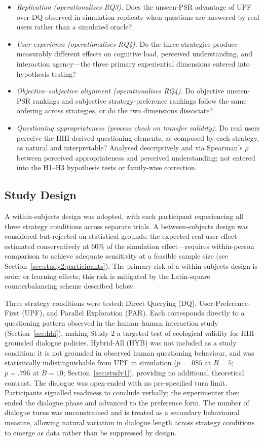 \documentclass[manuscript,review,anonymous]{acmart}
\begin{document}
\begin{itemize}[leftmargin=*]
  \item \textit{Replication (operationalises RQ3).} Does the unseen-PSR advantage of UPF over DQ observed in simulation replicate when questions are answered by real users rather than a simulated oracle?
  \item \textit{User experience (operationalises RQ4).} Do the three strategies produce measurably different effects on cognitive load, perceived understanding, and interaction agency---the three primary experiential dimensions entered into hypothesis testing?
  \item \textit{Objective--subjective alignment (operationalises RQ4).} Do objective unseen-PSR rankings and subjective strategy-preference rankings follow the same ordering across strategies, or do the two dimensions dissociate?
  \item \textit{Questioning appropriateness (process check on transfer validity).} Do real users perceive the HHI-derived questioning elements, as composed by each strategy, as natural and interpretable? Analysed descriptively and via Spearman's $\rho$ between perceived appropriateness and perceived understanding; not entered into the H1--H3 hypothesis tests or family-wise correction.
\end{itemize}

\subsection{Study Design}
\label{sec:study2:design}

A within-subjects design was adopted, with each participant experiencing all three strategy conditions across separate trials. A between-subjects design was considered but rejected on statistical grounds: the expected real-user effect---estimated conservatively at 60\% of the simulation effect---requires within-person comparison to achieve adequate sensitivity at a feasible sample size (see Section~\ref{sec:study2:participants}). The primary risk of a within-subjects design is order or learning effects; this risk is mitigated by the Latin-square counterbalancing scheme described below.

Three strategy conditions were tested: Direct Querying (DQ), User-Preference-First (UPF), and Parallel Exploration (PAR). Each corresponds directly to a questioning pattern observed in the human--human interaction study (Section~\ref{sec:hhi}), making Study 2 a targeted test of ecological validity for HHI-grounded dialogue policies. Hybrid-All (HYB) was not included as a study condition: it is not grounded in observed human questioning behaviour, and was statistically indistinguishable from UPF in simulation ($p = .085$ at $B = 5$; $p = .796$ at $B = 10$; Section~\ref{sec:study1}), providing no additional theoretical contrast. The dialogue was open-ended with no pre-specified turn limit. Participants signalled readiness to conclude verbally; the experimenter then ended the dialogue phase and advanced to the preference form. The number of dialogue turns was unconstrained and is treated as a secondary behavioural measure, allowing natural variation in dialogue length across strategy conditions to emerge as data rather than be suppressed by design.
\end{document}
